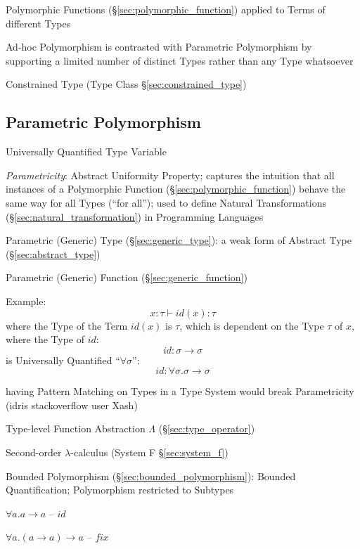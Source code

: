 Polymorphic Functions (\S\ref{sec:polymorphic_function}) applied to
Terms of different Types

Ad-hoc Polymorphism is contrasted with Parametric Polymorphism by
supporting a limited number of distinct Types rather than any Type
whatsoever

Constrained Type (Type Class \S\ref{sec:constrained_type})



\subsection{Parametric Polymorphism}\label{sec:parametric_polymorphism}

Universally Quantified Type Variable

\emph{Parametricity}: Abstract Uniformity Property; captures the
intuition that all instances of a Polymorphic Function
(\S\ref{sec:polymorphic_function}) behave the same way for all Types
(``for all''); used to define Natural Transformations
(\S\ref{sec:natural_transformation}) in Programming Languages

Parametric (Generic) Type (\S\ref{sec:generic_type}): a weak form of
Abstract Type (\S\ref{sec:abstract_type})

Parametric (Generic) Function (\S\ref{sec:generic_function})

Example:
\[
  x:\tau \vdash id(x):\tau
\]
where the Type of the Term $id(x)$ is $\tau$, which is dependent on
the Type $\tau$ of $x$, where the Type of $id$:
\[
  id:\sigma \rightarrow \sigma
\]
is Universally Quantified ``$\forall \sigma$'':
\[
  id:\forall \sigma.\sigma \rightarrow \sigma
\]


having Pattern Matching on Types in a Type System would break
Parametricity (idris stackoverflow user Xash) %

Type-level Function Abstraction $\Lambda$ (\S\ref{sec:type_operator})

Second-order $\lambda$-calculus (System F \S\ref{sec:system_f})

Bounded Polymorphism (\S\ref{sec:bounded_polymorphism}): Bounded
Quantification; Polymorphism restricted to Subtypes


\asterism


$\forall a.a \rightarrow a$ -- $id$

$\forall a.(a \rightarrow a) \rightarrow a$ -- $fix$

